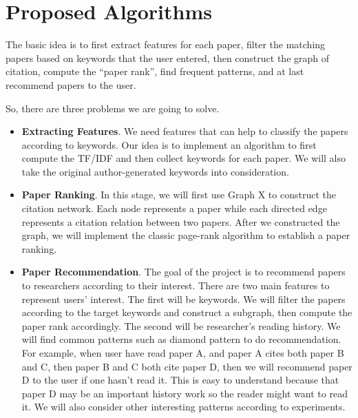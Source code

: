 \section{Proposed Algorithms}

The basic idea is to first extract features for each paper, filter the matching papers based on keywords that the user entered, then construct the graph of citation, compute the ``paper rank'', find frequent patterns, and at last recommend papers to the user.

So, there are three problems we are going to solve.

\begin{itemize}
	\item \textbf{Extracting Features}. We need features that can help to classify the papers according to keywords. Our idea is to implement an algorithm to first compute the TF/IDF and then collect keywords for each paper. We will also take the original author-generated keywords into consideration.
	\item \textbf{Paper Ranking}. In this stage, we will first use Graph X to construct the citation network. Each node represents a paper while each directed edge represents a citation relation between two papers. After we constructed the graph, we will implement the classic page-rank algorithm to establish a paper ranking. 
	\item \textbf{Paper Recommendation}. The goal of the project is to recommend papers to researchers according to their interest. There are two main features to represent users' interest. The first will be keywords. We will filter the papers according to the target keywords and construct a subgraph, then compute the paper rank accordingly. The second will be researcher's reading history. We will find common patterns such as diamond pattern to do recommendation. For example, when user have read paper A, and paper A cites both paper B and C, then paper B and C both cite paper D, then we will recommend paper D to the user if one hasn't read it. This is easy to understand because that paper D may be an important history work so the reader might want to read it. We will also consider other interesting patterns according to experiments.
\end{itemize}